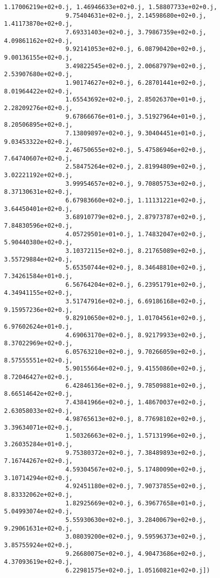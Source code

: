 \documentclass[11pt]{article}
\begin{document}
\begin{Verbatim}[commandchars=\\\{\}]
                 1.17006219e+02+0.j, 1.46946633e+02+0.j, 1.58807733e+02+0.j,
                 9.75404631e+02+0.j, 2.14598680e+02+0.j, 1.41173870e+02+0.j,
                 7.69331403e+02+0.j, 3.79867359e+02+0.j, 4.09861162e+02+0.j,
                 9.92141053e+02+0.j, 6.08790420e+02+0.j, 9.00136155e+02+0.j,
                 3.49822545e+02+0.j, 2.00687979e+02+0.j, 2.53907680e+02+0.j,
                 1.90174627e+02+0.j, 6.28701441e+02+0.j, 8.01964422e+02+0.j,
                 1.65543692e+02+0.j, 2.85026370e+01+0.j, 2.28209276e+02+0.j,
                 9.67866676e+01+0.j, 3.51927964e+01+0.j, 8.20506895e+02+0.j,
                 7.13809897e+02+0.j, 9.30404451e+01+0.j, 9.03453322e+02+0.j,
                 2.46750655e+02+0.j, 5.47586946e+02+0.j, 7.64740607e+02+0.j,
                 2.58475264e+02+0.j, 2.81994809e+02+0.j, 3.02221192e+02+0.j,
                 3.99954657e+02+0.j, 9.70805753e+02+0.j, 8.37130631e+02+0.j,
                 6.67983660e+02+0.j, 1.11131221e+02+0.j, 3.64450401e+02+0.j,
                 3.68910779e+02+0.j, 2.87973787e+02+0.j, 7.84830596e+02+0.j,
                 4.05729501e+01+0.j, 1.74832047e+02+0.j, 5.90440380e+02+0.j,
                 3.10372115e+02+0.j, 8.21765089e+02+0.j, 3.55729884e+02+0.j,
                 5.65350744e+02+0.j, 8.34648810e+02+0.j, 7.34261584e+01+0.j,
                 6.56764204e+02+0.j, 6.23951791e+02+0.j, 4.34941155e+02+0.j,
                 3.51747916e+02+0.j, 6.69186168e+02+0.j, 9.15957236e+02+0.j,
                 9.82910650e+02+0.j, 1.01704561e+02+0.j, 6.97602624e+01+0.j,
                 4.69063170e+02+0.j, 8.92179933e+02+0.j, 8.37022969e+02+0.j,
                 6.05763210e+02+0.j, 9.70266059e+02+0.j, 8.57555551e+02+0.j,
                 5.90155664e+02+0.j, 9.41550860e+02+0.j, 8.72046427e+02+0.j,
                 6.42846136e+02+0.j, 9.78509881e+02+0.j, 8.66514642e+02+0.j,
                 7.43841966e+02+0.j, 1.48670037e+02+0.j, 2.63058033e+02+0.j,
                 4.98765613e+02+0.j, 8.77698102e+02+0.j, 3.39634071e+02+0.j,
                 1.50326663e+02+0.j, 1.57131996e+02+0.j, 3.26035284e+01+0.j,
                 9.75380372e+02+0.j, 7.38489893e+02+0.j, 7.16744267e+02+0.j,
                 4.59304567e+02+0.j, 5.17480090e+02+0.j, 3.10714294e+02+0.j,
                 4.92451180e+02+0.j, 7.90737855e+02+0.j, 8.83332062e+02+0.j,
                 1.82925669e+02+0.j, 6.39677658e+01+0.j, 5.04993074e+02+0.j,
                 5.55930630e+02+0.j, 3.28400679e+02+0.j, 9.29061631e+02+0.j,
                 3.08039200e+02+0.j, 9.59596373e+02+0.j, 3.85755924e+02+0.j,
                 9.26680075e+02+0.j, 4.90473686e+02+0.j, 4.37093619e+02+0.j,
                 6.22981575e+02+0.j, 1.05160821e+02+0.j])
\end{Verbatim}
            
\end{document}
